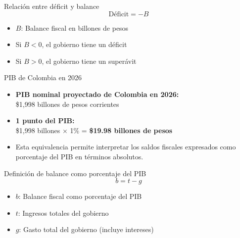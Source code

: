 \begin{frame}{Relación entre déficit y balance}
\begin{equation*}
\text{Déficit} = -B
\end{equation*}
\vspace{0.5em}
\begin{itemize}
  \item $B$: Balance fiscal en billones de pesos
  \item Si $B < 0$, el gobierno tiene un déficit
  \item Si $B > 0$, el gobierno tiene un superávit
\end{itemize}
\end{frame}


\begin{frame}{PIB de Colombia en 2026}
\begin{itemize}
  \item \textbf{PIB nominal proyectado de Colombia en 2026:} \\
  \quad \$1,998 billones de pesos corrientes
  
  \vspace{1em}
  \item \textbf{1 punto del PIB:} \\
  \quad \$1,998 billones × 1\% = \textbf{\$19.98 billones de pesos}
  
  \vspace{1em}
  \item Esta equivalencia permite interpretar los saldos fiscales expresados como porcentaje del PIB en términos absolutos.
\end{itemize}
\end{frame}


\begin{frame}{Definición de balance como porcentaje del PIB}
\begin{equation*}
b = t - g
\end{equation*}
\vspace{0.5em}
\begin{itemize}
  \item $b$: Balance fiscal como porcentaje del PIB
  \item $t$: Ingresos totales del gobierno
  \item $g$: Gasto total del gobierno (incluye intereses)
\end{itemize}
\end{frame}

